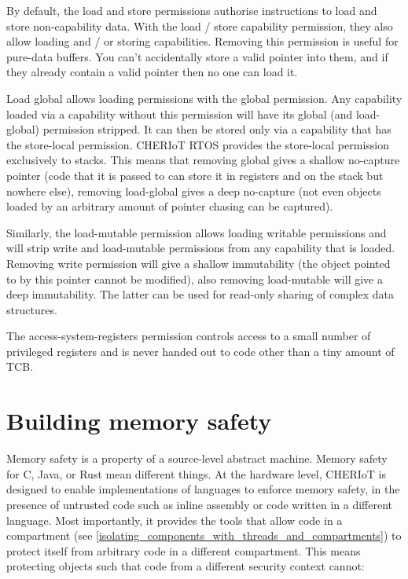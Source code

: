 By default, the load and store permissions authorise instructions to load and store non-capability data.
With the load / store capability permission, they also allow loading and / or storing capabilities.
Removing this permission is useful for pure-data buffers.
You can't accidentally store a valid pointer into them, and if they already contain a valid pointer then no one can load it.

Load global allows loading permissions with the global permission.
Any capability loaded via a capability without this permission will have its global (and load-global) permission stripped.
It can then be stored only via a capability that has the store-local permission.
CHERIoT RTOS provides the store-local permission exclusively to stacks.
This means that removing global gives a shallow no-capture pointer (code that it is passed to can store it in registers and on the stack but nowhere else), removing load-global gives a deep no-capture (not even objects loaded by an arbitrary amount of pointer chasing can be captured).

Similarly, the load-mutable permission allows loading writable permissions and will strip write and load-mutable permissions from any capability that is loaded.
Removing write permission will give a shallow immutability (the object pointed to by this pointer cannot be modified), also removing load-mutable will give a deep immutability.
The latter can be used for read-only sharing of complex data structures.

The access-system-registers permission controls access to a small number of privileged registers and is never handed out to code other than a tiny amount of TCB.

\section{Building memory safety}

Memory safety is a property of a source-level abstract machine.
Memory safety for C, Java, or Rust mean different things.
At the hardware level, CHERIoT is designed to enable implementations of languages to enforce memory safety, in the presence of untrusted code such as inline assembly or code written in a different language.
Most importantly, it provides the tools that allow code in a compartment (see \ref{isolating_components_with_threads_and_compartments}) to protect itself from arbitrary code in a different compartment.
This means protecting objects such that code from a different security context cannot:

